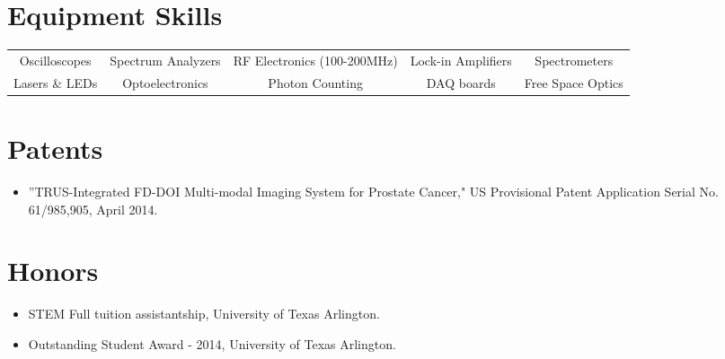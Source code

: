 \documentclass{my_cv}
\begin{document}
\section{Equipment Skills}

\vspace{2pt} %
\begin{center}

\begin{tabular}{c|c|c|c|c} Oscilloscopes & Spectrum Analyzers & RF Electronics (100-200MHz) & Lock-in Amplifiers &Spectrometers\\
Lasers \& LEDs & Optoelectronics &Photon Counting &DAQ boards &Free Space Optics\end{tabular}
\end{center}


\vspace{-7mm}  %


\section{{Patents}} 

\vspace{-2mm} %
\begin{itemize} \itemsep -2pt %
\item ''TRUS-Integrated FD-DOI Multi-modal Imaging System for Prostate Cancer," US Provisional Patent Application Serial No. 61/985,905, April 2014. 
\end{itemize}


\vspace{-5mm}  %

\section{{Honors}} 

\begin{itemize} \itemsep -2pt 
\item STEM Full tuition assistantship, University of Texas Arlington. \\
\item Outstanding Student Award - 2014, University of Texas Arlington. \\
\end{itemize}
\end{document}
